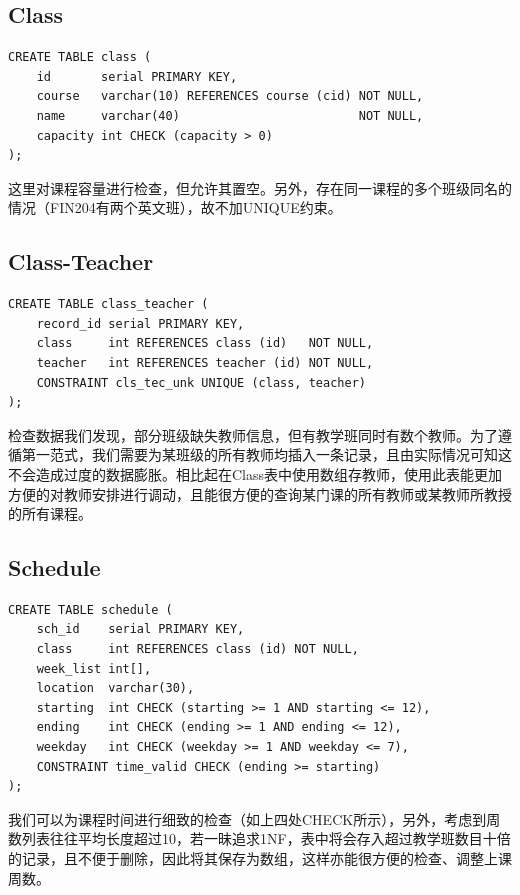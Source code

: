 \subsection{Class}
\begin{lstlisting}
CREATE TABLE class (
    id       serial PRIMARY KEY,
    course   varchar(10) REFERENCES course (cid) NOT NULL,
    name     varchar(40)                         NOT NULL,
    capacity int CHECK (capacity > 0)
);
\end{lstlisting}
\vspace{-3em}\par
这里对课程容量进行检查，但允许其置空。另外，存在同一课程的多个班级同名的情况（FIN204有两个英文班），故不加UNIQUE约束。

\subsection{Class-Teacher}
\begin{lstlisting}
CREATE TABLE class_teacher (
    record_id serial PRIMARY KEY,
    class     int REFERENCES class (id)   NOT NULL,
    teacher   int REFERENCES teacher (id) NOT NULL,
    CONSTRAINT cls_tec_unk UNIQUE (class, teacher)
);
\end{lstlisting}
\vspace{-3em}\par
检查数据我们发现，部分班级缺失教师信息，但有教学班同时有数个教师。为了遵循第一范式，我们需要为某班级的所有教师均插入一条记录，且由实际情况可知这不会造成过度的数据膨胀。相比起在Class表中使用数组存教师，使用此表能更加方便的对教师安排进行调动，且能很方便的查询某门课的所有教师或某教师所教授的所有课程。

\subsection{Schedule}
\begin{lstlisting}
CREATE TABLE schedule (
    sch_id    serial PRIMARY KEY,
    class     int REFERENCES class (id) NOT NULL,
    week_list int[],
    location  varchar(30),
    starting  int CHECK (starting >= 1 AND starting <= 12),
    ending    int CHECK (ending >= 1 AND ending <= 12),
    weekday   int CHECK (weekday >= 1 AND weekday <= 7),
    CONSTRAINT time_valid CHECK (ending >= starting)
);
\end{lstlisting}
\vspace{-3em}\par
我们可以为课程时间进行细致的检查（如上四处CHECK所示），另外，考虑到周数列表往往平均长度超过10，若一昧追求1NF，表中将会存入超过教学班数目十倍的记录，且不便于删除，因此将其保存为数组，这样亦能很方便的检查、调整上课周数。

